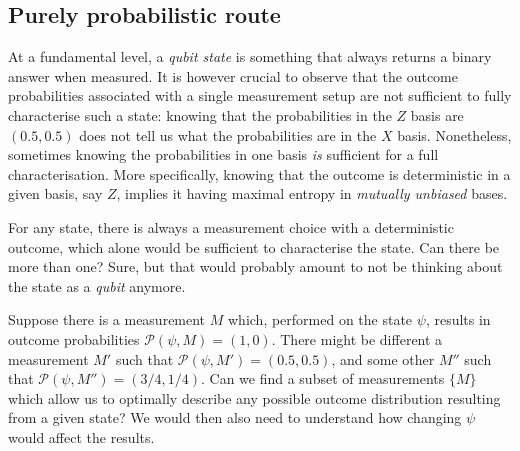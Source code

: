 \documentclass[12pt]{report}
\newcommand{\calP}{{\mathcal{P}}}
\begin{document}
\subsection{Purely probabilistic route}

At a fundamental level, a \emph{qubit state} is something that always returns a binary answer when measured.
It is however crucial to observe that the outcome probabilities associated with a single measurement setup are not sufficient to fully characterise such a state: knowing that the probabilities in the $Z$ basis are $(0.5,0.5)$ does not tell us what the probabilities are in the $X$ basis.
Nonetheless, sometimes knowing the probabilities in one basis \emph{is} sufficient for a full characterisation. More specifically, knowing that the outcome is deterministic in a given basis, say $Z$, implies it having maximal entropy in \emph{mutually unbiased} bases.

For any state, there is always a measurement choice with a deterministic outcome, which alone would be sufficient to characterise the state. Can there be more than one? Sure, but that would probably amount to not be thinking about the state as a \emph{qubit} anymore.

Suppose there is a measurement $M$ which, performed on the state $\psi$, results in outcome probabilities $\calP(\psi,M)=(1,0)$.
There might be different a measurement $M'$ such that $\calP(\psi,M')=(0.5,0.5)$, and some other $M''$ such that $\calP(\psi,M'')=(3/4,1/4)$. Can we find a subset of measurements $\{M\}$ which allow us to optimally describe any possible outcome distribution resulting from a given state?
We would then also need to understand how changing $\psi$ would affect the results.
\end{document}
